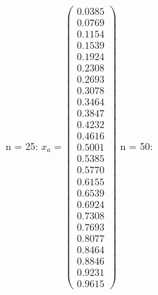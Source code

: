 \documentclass{udpreport}
\begin{document}
\begin{enumerate}
\begin{enumerate}
{{{{\begin{itemize}
					 n = 25: 
					$x_{a} = \left(\begin{array}{c} 0.0385\\ 0.0769\\ 0.1154\\ 0.1539\\ 0.1924\\ 0.2308\\ 0.2693\\ 0.3078\\ 0.3464\\ 0.3847\\ 0.4232\\ 0.4616\\ 0.5001\\ 0.5385\\ 0.5770\\ 0.6155\\ 0.6539\\ 0.6924\\ 0.7308\\ 0.7693\\ 0.8077\\ 0.8464\\ 0.8846\\ 0.9231\\ 0.9615 \end{array}\right) $	
					 n = 50:

\end{itemize}}}}}
\end{enumerate}
\end{enumerate}
\end{document}
